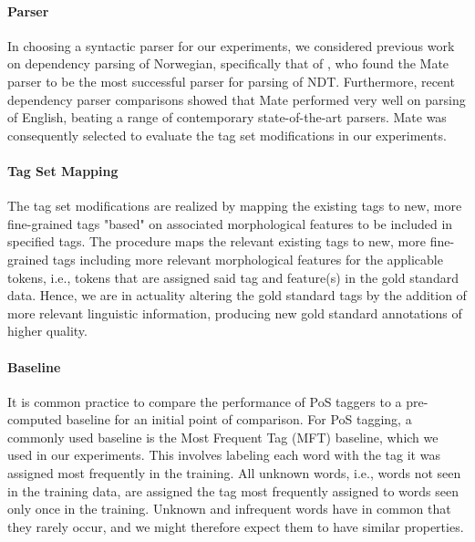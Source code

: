\documentclass[11pt,a4paper]{article}
\begin{document}
\paragraph{Parser}
In choosing a syntactic parser for our experiments, we considered previous work
on dependency parsing of Norwegian, specifically that of
, who found the Mate parser \cite{Boh:10} to be the
most successful parser for parsing of NDT. Furthermore, recent dependency
parser comparisons \cite{Cho:Tet:Ste:15} showed that Mate performed very well
on parsing of English, beating a range of contemporary state-of-the-art
parsers. Mate was consequently selected to evaluate the tag set modifications in
our experiments.

\paragraph{Tag Set Mapping}
The tag set modifications are realized by mapping the existing tags to new,
more fine-grained tags "based" on associated morphological features to be
included in specified tags. The procedure maps the relevant existing tags to
new, more fine-grained tags including more relevant morphological features for
the applicable tokens, i.e., tokens that are assigned said tag and feature(s)
in the gold standard data. Hence, we are in actuality altering the gold
standard tags by the addition of more relevant linguistic information,
producing new gold standard annotations of higher quality.



\paragraph{Baseline}
It is common practice to compare the performance of PoS taggers to a
pre-computed baseline for an initial point of comparison.  For PoS tagging, a
commonly used baseline is the Most Frequent Tag (MFT) baseline, which we used
in our experiments. This involves labeling each word with the tag it was
assigned most frequently in the training. All unknown words, i.e., words not
seen in the training data, are assigned the tag most frequently assigned to
words seen only once in the training. Unknown and infrequent words have in
common that they rarely occur, and we might therefore expect them to have
similar properties.
\end{document}
